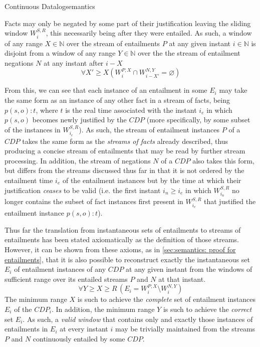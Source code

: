 \begin{nestedsection}{Continuous Datalog}{semantics}
	\begin{axiom}\label{axiom:continuous datalog: entailment precedes negation}
		Facts may only be negated by some part of their justification leaving the sliding window $W^{S,R}_{i}$, this necessarily being after they were entailed.
		As such, a window of any range ${X \in \mathbb{N}}$ over the stream of entailments $P$ at any given instant ${i \in \mathbb{N}}$ is disjoint from a window of any range ${Y \in \mathbb{N}}$ over the the stream of entailment negations $N$ at any instant after ${i - X}$
		\begin{equation*}
			\forall X' \geq X \left( W^{P,X}_{i} \cap W^{N,Y}_{i-X'} = \varnothing \right)
		\end{equation*}
	\end{axiom}

	From this, we can see that each instance of an entailment in some $E_{i}$ may take the same form as an instance of any other fact in a stream of facts, being ${p(s,o):t}$, where $t$ is the real time associated with the instant $i_{e}$ in which ${p(s,o)}$ becomes newly justified by the ${CDP}$
	(more specifically, by some subset of the instances in $W^{S,R}_{i_{e}}$).
	As such, the stream of entailment instances $P$ of a ${CDP}$ takes the same form as the \emph{streams of facts} already described, thus producing a concise stream of entailments that may be read by further stream processing.
	In addition, the stream of negations $N$ of a ${CDP}$ also takes this form, but differs from the streams discussed thus far in that it is not ordered by the entailment time $i_{e}$ of the entailment instances but by the time at which their justification \emph{ceases} to be valid
	(i.e. the first instant ${i_{n} \geq i_{e}}$ in which $W^{S,R}_{i_{n}}$ no longer contains the subset of fact instances first present in $W^{S,R}_{i_{e}}$ that justified the entailment instance ${p(s,o):t}$).

	Thus far the translation from instantaneous sets of entailments to streams of entailments has been stated axiomatically as the definition of those streams.
	However, it can be shown from these axioms,
	as in \ref{sec:semantics: proof for entailments},
	that it is also possible to reconstruct exactly the instantaneous set $E_{i}$ of entailment instances of any ${CDP}$ at any given instant from the windows of sufficient range over its entailed streams $P$ and $N$ at that instant.
	\[ \forall Y \geq X \geq R \, \left( E_{i} = W^{P,X}_{i} \setminus W^{N,Y}_{i} \right) \]
	The minimum range $X$ is such to achieve the \emph{complete} set of entailment instances $E_{i}$ of the ${CDP}_{i}$.
	In addition, the minimum range $Y$ is such to achieve the \emph{correct} set $E_{i}$.
	As such, a \emph{valid window} that contains only and exactly those instances of entailments in $E_{i}$ at every instant $i$ may be trivially maintained from the streams $P$ and $N$ continuously entailed by some ${CDP}$.
\end{nestedsection}
